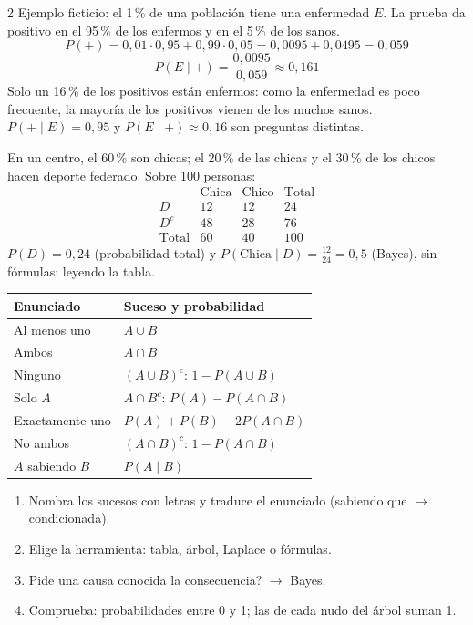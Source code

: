 \documentclass[10pt]{article}
\begin{document}
\begin{multicols}{2}
Ejemplo ficticio: el 1\,\% de una población tiene una enfermedad \(E\). La prueba da positivo en el 95\,\% de los enfermos y en el 5\,\% de los sanos.
\[P(+)=0{,}01\cdot0{,}95+0{,}99\cdot0{,}05=0{,}0095+0{,}0495=0{,}059\]
\[P(E\mid +)=\frac{0{,}0095}{0{,}059}\approx0{,}161\]
Solo un 16\,\% de los positivos están enfermos: como la enfermedad es poco frecuente, la mayoría de los positivos vienen de los muchos sanos. \(P(+\mid E)=0{,}95\) y \(P(E\mid +)\approx0{,}16\) son preguntas distintas.

En un centro, el 60\,\% son chicas; el 20\,\% de las chicas y el 30\,\% de los chicos hacen deporte federado. Sobre 100 personas:
\[\begin{array}{l|cc|c}
 & \text{Chica} & \text{Chico} & \text{Total}\\\hline
D & 12 & 12 & 24\\
D^c & 48 & 28 & 76\\\hline
\text{Total} & 60 & 40 & 100
\end{array}\]
\(P(D)=0{,}24\) (probabilidad total) y \(P(\text{Chica}\mid D)=\frac{12}{24}=0{,}5\) (Bayes), sin fórmulas: leyendo la tabla.

\begin{tabular}{@{}p{3.2cm}p{4.6cm}@{}}
\textbf{Enunciado} & \textbf{Suceso y probabilidad}\\ \hline
Al menos uno & \(A\cup B\)\\
Ambos & \(A\cap B\)\\
Ninguno & \((A\cup B)^c\): \(1-P(A\cup B)\)\\
Solo \(A\) & \(A\cap B^c\): \(P(A)-P(A\cap B)\)\\
Exactamente uno & \(P(A)+P(B)-2P(A\cap B)\)\\
No ambos & \((A\cap B)^c\): \(1-P(A\cap B)\)\\
\(A\) sabiendo \(B\) & \(P(A\mid B)\)
\end{tabular}

\begin{enumerate}
  \item Nombra los sucesos con letras y traduce el enunciado (\guillemotleft{}sabiendo que\guillemotright{} \(\to\) condicionada).
  \item Elige la herramienta: tabla, árbol, Laplace o fórmulas.
  \item \textquestiondown{}Pide una causa conocida la consecuencia? \(\to\) Bayes.
  \item Comprueba: probabilidades entre 0 y 1; las de cada nudo del árbol suman 1.
\end{enumerate}


\end{multicols}
\end{document}
